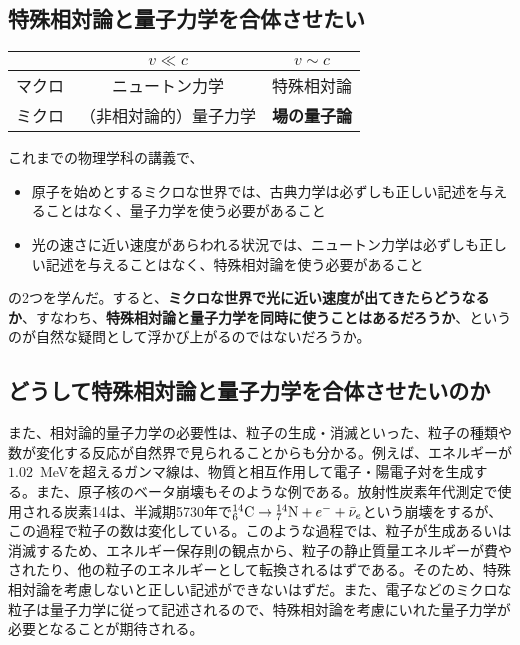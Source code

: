 \documentclass[10pt,a4paper]{jarticle}
\begin{document}
\subsection{特殊相対論と量子力学を合体させたい}
\begin{table}[h]
\centering
\begin{tabular}{c|cc}
& $v\ll c$ & $v\sim c$ \\\hline
マクロ & ニュートン力学 & 特殊相対論 \\
ミクロ & （非相対論的）量子力学 & \textbf{場の量子論}
\end{tabular}
\end{table}
これまでの物理学科の講義で、
\begin{itemize}
\item 原子を始めとするミクロな世界では、古典力学は必ずしも正しい記述を与えることはなく、量子力学を使う必要があること
\item 光の速さに近い速度があらわれる状況では、ニュートン力学は必ずしも正しい記述を与えることはなく、特殊相対論を使う必要があること
\end{itemize}
の2つを学んだ。すると、\textbf{ミクロな世界で光に近い速度が出てきたらどうなるか}、すなわち、\textbf{特殊相対論と量子力学を同時に使うことはあるだろうか}、というのが自然な疑問として浮かび上がるのではないだろうか。

\subsection{どうして特殊相対論と量子力学を合体させたいのか}
また、相対論的量子力学の必要性は、粒子の生成・消滅といった、粒子の種類や数が変化する反応が自然界で見られることからも分かる。例えば、エネルギーが$1.02$~MeVを超えるガンマ線は、物質と相互作用して電子・陽電子対を生成する。また、原子核のベータ崩壊もそのような例である。放射性炭素年代測定で使用される炭素14は、半減期5730年で${^{14}_{6}{\rm C}}\to {^{14}_{7}{\rm N}} + e^- + \bar\nu_e$という崩壊をするが、この過程で粒子の数は変化している。このような過程では、粒子が生成あるいは消滅するため、エネルギー保存則の観点から、粒子の静止質量エネルギーが費やされたり、他の粒子のエネルギーとして転換されるはずである。そのため、特殊相対論を考慮しないと正しい記述ができないはずだ。また、電子などのミクロな粒子は量子力学に従って記述されるので、特殊相対論を考慮にいれた量子力学が必要となることが期待される。
\end{document}
